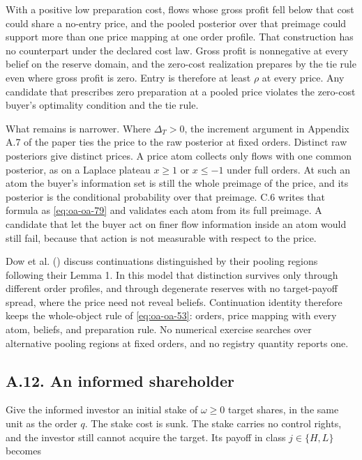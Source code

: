 \documentclass[
  11pt,
]{article}
\begin{document}
With a positive low preparation cost, flows whose gross profit fell below that
cost could share a no-entry price, and the pooled posterior over that preimage
could support more than one price mapping at one order profile.
That construction has no counterpart under the declared cost law.
Gross profit is nonnegative at every belief on the reserve domain, and the
zero-cost realization prepares by the tie rule even where gross profit is zero.
Entry is therefore at least \(\rho\) at every price. Any candidate that
prescribes zero preparation at a pooled price violates the zero-cost
buyer's optimality condition and the tie rule.

What remains is narrower. Where \(\Delta_T>0\), the increment argument in
Appendix A.7 of the paper ties the price to the raw posterior at fixed orders.
Distinct raw posteriors give distinct prices.
A price atom collects only flows with one common posterior, as on a Laplace
plateau \(x\ge1\) or \(x\le-1\) under full orders.
At such an atom the buyer's information set is still the whole preimage of the
price, and its posterior is the conditional probability over that preimage.
C.6 writes that formula as \eqref{eq:oa-oa-79} and validates each atom from its
full preimage. A candidate that let the buyer act on finer flow information
inside an atom would still fail, because that action is not measurable with
respect to the price.

Dow et al. () discuss continuations
distinguished by their pooling regions following their Lemma 1.
In this model that distinction survives only through different order profiles,
and through degenerate reserves with no target-payoff spread, where the price
need not reveal beliefs. Continuation identity therefore keeps the whole-object
rule of \eqref{eq:oa-oa-53}: orders, price mapping with every atom, beliefs,
and preparation rule. No numerical exercise searches over alternative pooling
regions at fixed orders, and no registry quantity reports one.

\subsection{A.12. An informed shareholder}\label{oa-a-stake}

Give the informed investor an initial stake of \(\omega\ge 0\) target
shares, in the same unit as the order \(q\). The stake cost is sunk.
The stake carries no control rights, and the investor still cannot
acquire the target. Its payoff in class \(j\in\{H,L\}\) becomes
\end{document}
